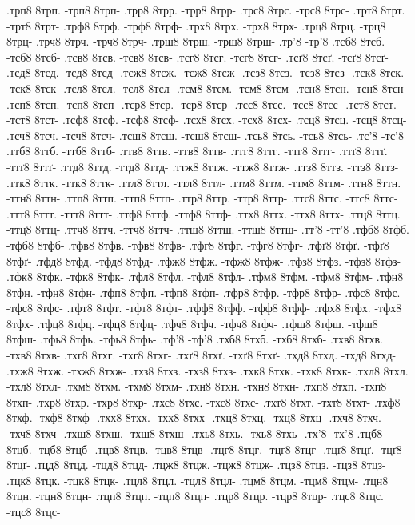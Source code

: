 {.трп8 8трп. -трп8 8трп-
.трр8 8трр. -трр8 8трр-
.трс8 8трс. -трс8 8трс-
.трт8 8трт. -трт8 8трт-
.трф8 8трф. -трф8 8трф-
.трх8 8трх. -трх8 8трх-
.трц8 8трц. -трц8 8трц-
.трч8 8трч. -трч8 8трч-
.трш8 8трш. -трш8 8трш-
.тр'8 -тр'8
.тсб8 8тсб. -тсб8 8тсб-
.тсв8 8тсв. -тсв8 8тсв-
.тсг8 8тсг. -тсг8 8тсг-
.тсґ8 8тсґ. -тсґ8 8тсґ-
.тсд8 8тсд. -тсд8 8тсд-
.тсж8 8тсж. -тсж8 8тсж-
.тсз8 8тсз. -тсз8 8тсз-
.тск8 8тск. -тск8 8тск-
.тсл8 8тсл. -тсл8 8тсл-
.тсм8 8тсм. -тсм8 8тсм-
.тсн8 8тсн. -тсн8 8тсн-
.тсп8 8тсп. -тсп8 8тсп-
.тср8 8тср. -тср8 8тср-
.тсс8 8тсс. -тсс8 8тсс-
.тст8 8тст. -тст8 8тст-
.тсф8 8тсф. -тсф8 8тсф-
.тсх8 8тсх. -тсх8 8тсх-
.тсц8 8тсц. -тсц8 8тсц-
.тсч8 8тсч. -тсч8 8тсч-
.тсш8 8тсш. -тсш8 8тсш-
.тсь8 8тсь. -тсь8 8тсь-
.тс'8 -тс'8
.ттб8 8ттб. -ттб8 8ттб-
.ттв8 8ттв. -ттв8 8ттв-
.ттг8 8ттг. -ттг8 8ттг-
.ттґ8 8ттґ. -ттґ8 8ттґ-
.ттд8 8ттд. -ттд8 8ттд-
.ттж8 8ттж. -ттж8 8ттж-
.ттз8 8ттз. -ттз8 8ттз-
.ттк8 8ттк. -ттк8 8ттк-
.ттл8 8ттл. -ттл8 8ттл-
.ттм8 8ттм. -ттм8 8ттм-
.ттн8 8ттн. -ттн8 8ттн-
.ттп8 8ттп. -ттп8 8ттп-
.ттр8 8ттр. -ттр8 8ттр-
.ттс8 8ттс. -ттс8 8ттс-
.ттт8 8ттт. -ттт8 8ттт-
.ттф8 8ттф. -ттф8 8ттф-
.ттх8 8ттх. -ттх8 8ттх-
.ттц8 8ттц. -ттц8 8ттц-
.ттч8 8ттч. -ттч8 8ттч-
.ттш8 8ттш. -ттш8 8ттш-
.тт'8 -тт'8
.тфб8 8тфб. -тфб8 8тфб-
.тфв8 8тфв. -тфв8 8тфв-
.тфг8 8тфг. -тфг8 8тфг-
.тфґ8 8тфґ. -тфґ8 8тфґ-
.тфд8 8тфд. -тфд8 8тфд-
.тфж8 8тфж. -тфж8 8тфж-
.тфз8 8тфз. -тфз8 8тфз-
.тфк8 8тфк. -тфк8 8тфк-
.тфл8 8тфл. -тфл8 8тфл-
.тфм8 8тфм. -тфм8 8тфм-
.тфн8 8тфн. -тфн8 8тфн-
.тфп8 8тфп. -тфп8 8тфп-
.тфр8 8тфр. -тфр8 8тфр-
.тфс8 8тфс. -тфс8 8тфс-
.тфт8 8тфт. -тфт8 8тфт-
.тфф8 8тфф. -тфф8 8тфф-
.тфх8 8тфх. -тфх8 8тфх-
.тфц8 8тфц. -тфц8 8тфц-
.тфч8 8тфч. -тфч8 8тфч-
.тфш8 8тфш. -тфш8 8тфш-
.тфь8 8тфь. -тфь8 8тфь-
.тф'8 -тф'8
.тхб8 8тхб. -тхб8 8тхб-
.тхв8 8тхв. -тхв8 8тхв-
.тхг8 8тхг. -тхг8 8тхг-
.тхґ8 8тхґ. -тхґ8 8тхґ-
.тхд8 8тхд. -тхд8 8тхд-
.тхж8 8тхж. -тхж8 8тхж-
.тхз8 8тхз. -тхз8 8тхз-
.тхк8 8тхк. -тхк8 8тхк-
.тхл8 8тхл. -тхл8 8тхл-
.тхм8 8тхм. -тхм8 8тхм-
.тхн8 8тхн. -тхн8 8тхн-
.тхп8 8тхп. -тхп8 8тхп-
.тхр8 8тхр. -тхр8 8тхр-
.тхс8 8тхс. -тхс8 8тхс-
.тхт8 8тхт. -тхт8 8тхт-
.тхф8 8тхф. -тхф8 8тхф-
.тхх8 8тхх. -тхх8 8тхх-
.тхц8 8тхц. -тхц8 8тхц-
.тхч8 8тхч. -тхч8 8тхч-
.тхш8 8тхш. -тхш8 8тхш-
.тхь8 8тхь. -тхь8 8тхь-
.тх'8 -тх'8
.тцб8 8тцб. -тцб8 8тцб-
.тцв8 8тцв. -тцв8 8тцв-
.тцг8 8тцг. -тцг8 8тцг-
.тцґ8 8тцґ. -тцґ8 8тцґ-
.тцд8 8тцд. -тцд8 8тцд-
.тцж8 8тцж. -тцж8 8тцж-
.тцз8 8тцз. -тцз8 8тцз-
.тцк8 8тцк. -тцк8 8тцк-
.тцл8 8тцл. -тцл8 8тцл-
.тцм8 8тцм. -тцм8 8тцм-
.тцн8 8тцн. -тцн8 8тцн-
.тцп8 8тцп. -тцп8 8тцп-
.тцр8 8тцр. -тцр8 8тцр-
.тцс8 8тцс. -тцс8 8тцс-
}
